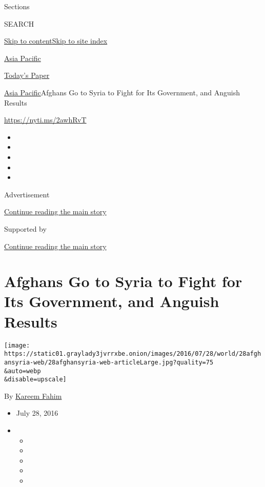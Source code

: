 Sections

SEARCH

\protect\hyperlink{site-content}{Skip to
content}\protect\hyperlink{site-index}{Skip to site index}

\href{https://www.nytimes3xbfgragh.onion/section/world/asia}{Asia
Pacific}

\href{https://myaccount.nytimes3xbfgragh.onion/auth/login?response_type=cookie\&client_id=vi}{}

\href{https://www.nytimes3xbfgragh.onion/section/todayspaper}{Today's
Paper}

\href{/section/world/asia}{Asia Pacific}\textbar{}Afghans Go to Syria to
Fight for Its Government, and Anguish Results

\url{https://nyti.ms/2awhRvT}

\begin{itemize}
\item
\item
\item
\item
\item
\end{itemize}

Advertisement

\protect\hyperlink{after-top}{Continue reading the main story}

Supported by

\protect\hyperlink{after-sponsor}{Continue reading the main story}

\hypertarget{afghans-go-to-syria-to-fight-for-its-government-and-anguish-results}{%
\section{Afghans Go to Syria to Fight for Its Government, and Anguish
Results}\label{afghans-go-to-syria-to-fight-for-its-government-and-anguish-results}}

\texttt{[image: https://static01.graylady3jvrrxbe.onion/images/2016/07/28/world/28afghansyria-web/28afghansyria-web-articleLarge.jpg?quality=75\\\&auto=webp\\\&disable=upscale]}

By \href{https://www.nytimes3xbfgragh.onion/by/kareem-fahim}{Kareem
Fahim}

\begin{itemize}
\item
  July 28, 2016
\item
  \begin{itemize}
  \item
  \item
  \item
  \item
  \item
  \end{itemize}
\end{itemize}


